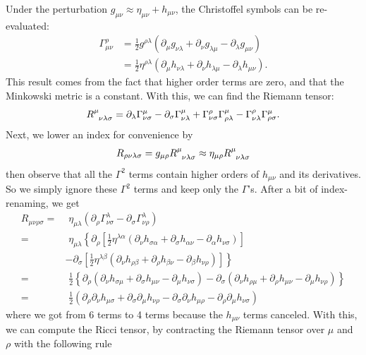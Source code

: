 \documentclass{book}
\numberwithin{equation}{section}
\theoremstyle{definition}
\newcommand{\p}{\partial}
\newcommand{\nn}{\nonumber}
\newcommand{\f}[2]{\frac{#1}{#2}}
\newcommand{\lp}{\left(}
\newcommand{\rp}{\right)}
\newcommand{\lb}{\left[}
\newcommand{\rb}{\right]}
\newcommand{\lc}{\left\{}
\newcommand{\rc}{\right\}}
\begin{document}
Under the perturbation $g_{\mu\nu} \approx \eta_{\mu\nu} + h_{\mu\nu}$, the Christoffel symbols can be re-evaluated:
\begin{align}
\Gamma^{\rho}_{\mu\nu} &= \f{1}{2}g^{\rho\lambda} \lp \p_\mu g_{\nu\lambda} + \p_\nu g_{\lambda\mu} - \p_\lambda g_{\mu\nu} \rp \\ 
&= \f{1}{2}\eta^{\rho\lambda}\lp \p_\mu h_{\nu\lambda} + \p_\nu h_{\lambda\mu} - \p_\lambda h_{\mu\nu} \rp.
\end{align}
This result comes from the fact that higher order terms are zero, and that the Minkowski metric is a constant. With this, we can find the Riemann tensor:
\begin{align}
\tensor{R}{^\mu_{\nu\lambda\sigma}}= \p_\lambda \Gamma^\mu_{\nu\sigma} - \p_\sigma \Gamma^\mu_{\nu\lambda} + \Gamma^{\rho}_{\nu\sigma} \Gamma^{\mu}_{\rho\lambda}- \Gamma^{\rho}_{\nu\lambda} \Gamma^{\mu}_{\rho\sigma}.
\end{align}
Next, we lower an index for convenience by 
\begin{align}
R_{\rho\nu\lambda\sigma} = g_{\mu\rho} \tensor{R}{^\mu_{\nu\lambda\sigma}} \approx \eta_{\mu\rho} \tensor{R}{^\mu_{\nu\lambda\sigma}}
\end{align}
then observe that all the $\Gamma^2$ terms contain higher orders of $h_{\mu\nu}$ and its derivatives. So we simply ignore these $\Gamma^2$ terms and keep only the $\Gamma$'s. After a bit of index-renaming, we get
\begin{align}
R_{\mu\nu\rho\sigma} =&\,\,\eta_{\mu\lambda}\lp \p_\rho \Gamma^\lambda_{\nu\sigma} - \p_\sigma \Gamma^\lambda_{\nu\rho} \rp\\
=&\,\, \eta_{\mu\lambda}\lc \p_\rho 
\lb 
\f{1}{2}\eta^{\lambda\alpha}\lp \p_\nu h_{\sigma\alpha} + \p_\sigma h_{\alpha\nu} - \p_\alpha h_{\nu\sigma} \rp
\rb \right. \nn \\
&\left.- \p_\sigma 
\lb 
\f{1}{2}\eta^{\lambda\beta}\lp \p_\nu h_{\rho\beta} + \p_\rho h_{\beta\nu} - \p_\beta h_{\nu\rho} \rp
\rb  
\rc\\
=&\,\, \f{1}{2}\lc 
\p_\rho \lp \p_\nu h_{\sigma\mu} + \p_\sigma h_{\mu\nu} - \p_\mu h_{\nu\sigma} \rp
-
\p_\sigma\lp \p_\nu h_{\rho\mu} + \p_\rho h_{\mu\nu} - \p_\mu h_{\nu\rho} \rp
\rc\\
=& \,\, \boxed{\f{1}{2}\lp \p_\rho\p_\nu h_{\mu\sigma} + \p_\sigma\p_\mu h_{\nu\rho} - \p_\sigma\p_\nu h_{\mu\rho} - \p_\rho \p_\mu h_{\nu\sigma} \rp}
\end{align}
where we got from 6 terms to 4 terms because the $h_{\mu\nu}$ terms canceled. With this, we can compute the Ricci tensor, by contracting the Riemann tensor over $\mu$ and $\rho$ with the following rule
\end{document}
